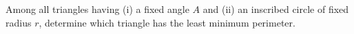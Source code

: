 Among all triangles having (i) a fixed angle $A$ and (ii) an inscribed circle of fixed radius $r$,  determine which triangle has the least minimum perimeter.